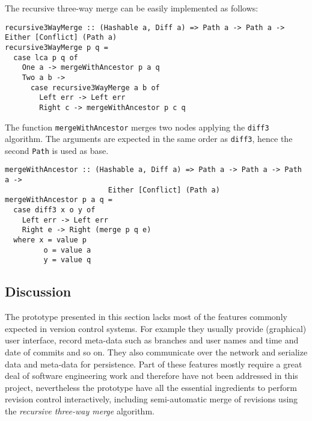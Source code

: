 \documentclass[../Thesis.tex]{subfiles}
\begin{document}
	The recursive three-way merge can be easily implemented as follows:

\begin{verbatim}
recursive3WayMerge :: (Hashable a, Diff a) => Path a -> Path a -> Either [Conflict] (Path a)
recursive3WayMerge p q = 
  case lca p q of
    One a -> mergeWithAncestor p a q 
    Two a b ->  
      case recursive3WayMerge a b of
        Left err -> Left err 
        Right c -> mergeWithAncestor p c q 
\end{verbatim}

	The function \texttt{mergeWithAncestor} merges two
	nodes applying the \texttt{diff3} algorithm. The arguments
	are expected in the same order as \texttt{diff3}, hence the second 
	\texttt{Path} is used as base.

\begin{verbatim}	
mergeWithAncestor :: (Hashable a, Diff a) => Path a -> Path a -> Path a -> 
                        Either [Conflict] (Path a)
mergeWithAncestor p a q = 
  case diff3 x o y of
    Left err -> Left err 
    Right e -> Right (merge p q e)
  where x = value p
         o = value a
         y = value q
\end{verbatim}
	
	\subsection{Discussion}
	The prototype presented in this section lacks most of the
	features commonly expected in version control systems.
	For example they usually provide (graphical) user interface, 
	record meta-data 
	such as branches and user names and time and date of 
	commits and so on. They also communicate over the 
	network and serialize data and meta-data for persistence.
	Part of these features mostly require a great deal of 
	software engineering work and therefore have not
	been addressed in this project,
	nevertheless the prototype have all the essential ingredients
	to perform revision control interactively, including
	semi-automatic merge of revisions using the \emph{recursive three-way
	merge} algorithm.
	
\end{document}
